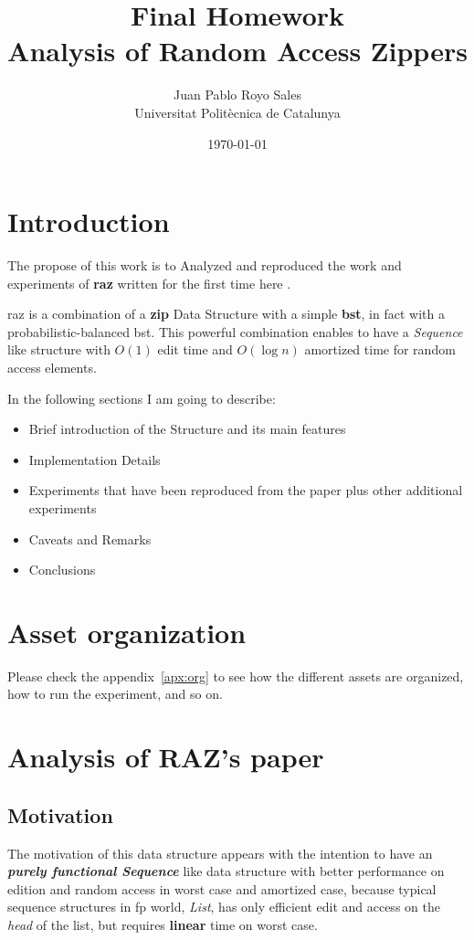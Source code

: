 \documentclass[12pt, a4paper]{article}
\title{%
      Final Homework\\
      Analysis of Random Access Zippers
}
\author{%
  Juan Pablo Royo Sales \\
  \small{Universitat Politècnica de Catalunya}
}
\date\today
\begin{document}
\maketitle

\section{Introduction}\label{sec:intro}
The propose of this work is to Analyzed and reproduced the work and experiments of \textbf{\acrfull{raz}} written for the first time here \cite{raz}.

\acrfull{raz} is a combination of a \textbf{\acrfull{zip}} Data Structure with a simple \textbf{\acrfull{bst}}, in fact with a probabilistic-balanced \acrshort{bst}. This powerful combination enables to have a \textit{Sequence} like structure with $O(1)$ edit time and $O(\log{n})$ amortized time for random access elements.

In the following sections I am going to describe:

\begin{itemize}
    \item Brief introduction of the Structure and its main features
    \item Implementation Details
    \item Experiments that have been reproduced from the paper plus other additional experiments
    \item Caveats and Remarks
    \item Conclusions
\end{itemize}

\section{Asset organization}
Please check the appendix~\ref{apx:org} to see how the different assets are organized, how to run the experiment, and so on.

\section{Analysis of RAZ's paper}
\subsection{Motivation}
The motivation of this data structure appears with the intention to have an \textbf{\textit{purely functional Sequence}} like data structure with better performance on edition and random access in worst case and amortized case, because typical sequence structures in \acrfull{fp} world, \textit{List}, has only efficient edit and access on the \textit{head} of the list, but requires \textbf{linear} time on worst case.
\end{document}
